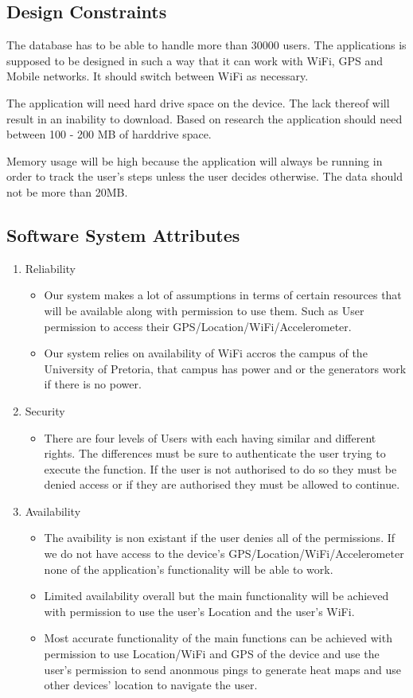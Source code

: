 \documentclass[11pt]{article}
\begin{document}
		\subsection{Design Constraints}
    		The database has to be able to handle more than 30000 users. The applications is supposed to be designed in such a way 			that it can work with WiFi, GPS and Mobile networks. It should switch between WiFi as necessary.

		    The application will need hard drive space on the device. The lack thereof will result in an inability to download. 			Based on research the application should need between 100 - 200 MB of harddrive space. 

		    Memory usage will be high because the application will always be running in order to track the user’s steps unless the 			user decides otherwise. The data should not be more than 20MB.

		\subsection{Software System Attributes}
			\begin{enumerate}
				\item Reliability 
					\begin{itemize}
						\item Our system makes a lot of assumptions in terms of certain resources that will be available along with permission to use them. Such as User permission to access their GPS/Location/WiFi/Accelerometer.
						\item Our system relies on availability of WiFi accros the campus of the University of Pretoria, that campus has power and or the generators work if there is no power.
					\end{itemize}
				\item Security 
					\begin{itemize}
						\item There are four levels of Users with each having similar and different rights. The differences must be sure to authenticate the user trying to execute the function. If the user is not authorised to do so they must be denied access or if they are authorised they must be allowed to continue.
					\end{itemize}
				\item Availability
					\begin{itemize}
						\item The avaibility is non existant if the user denies all of the permissions. If we do not have access to the device's GPS/Location/WiFi/Accelerometer none of the application's functionality will be able to work.
						\item Limited availability overall but the main functionality will be achieved with permission to use the user's Location and the user's WiFi.
						\item Most accurate functionality of the main functions can be achieved with permission to use Location/WiFi and GPS of the device and use the user's permission to send anonmous pings to generate heat maps and use other devices' location to navigate the user.
					\end{itemize}
			\end{enumerate}
\end{document}
